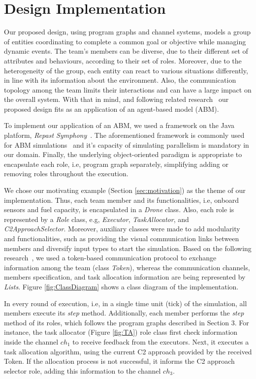 \newpage
\section{Design Implementation}
\label{sec:design}

Our proposed design, using program graphs and channel systems, models a group of entities coordinating to complete a common goal or objective while managing dynamic events. The team's members can be diverse, due to their different set of attributes and behaviours, according to their set of roles. Moreover, due to the heterogeneity of the group, each entity can react to various situations differently, in line with its information about the environment. Also, the communication topology among the team limits their interactions and can have a large impact on the overall system. With that in mind, and following related research~\cite{evaluating} our proposed design fits as an application of an agent-based model (ABM). 

To implement our application of an ABM, we used a framework on the Java platform, \textit{Repast Symphony}~\cite{repastDoc}. The aforementioned framework is commonly used for ABM simulations~\cite{repast} and it's capacity of simulating parallelism is mandatory in our domain. Finally, the underlying object-oriented paradigm is appropriate to encapsulate each role, i.e, program graph separately, simplifying adding or removing roles throughout the execution.

We chose our motivating example (Section \ref{sec:motivation}) as the theme of our implementation. Thus, each team member and its functionalities, i.e, onboard sensors and fuel capacity, is encapsulated in a \textit{Drone} class. Also, each role is represented by a \textit{Role} class, e.g, \textit{Executor}, \textit{TaskAllocator}, and \textit{C2ApproachSelector}. Moreover, auxiliary classes were made to add modularity and functionalities, such as providing the visual communication links between members and diversify input types to start the simulation. Based on the following research~\cite{swarmGap}, we used a token-based communication protocol to exchange information among the team (class \textit{Token}), whereas the communication channels, members specification, and task allocation information are being represented by \textit{Lists}. Figure \ref{fig:ClassDiagram} shows a class diagram of the implementation.

In every round of execution, i.e, in a single time unit (tick) of the simulation, all members execute its \textit{step} method. Additionally, each member performs the \textit{step} method of its roles, which follows the program graphs described in Section 3. For instance, the task allocator (Figure \ref{fig:TA}) role class first check information inside the channel $ch_1$ to receive feedback from the executors. Next, it executes a task allocation algorithm, using the current C2 approach provided by the received Token. If the allocation process is not successful, it informs the C2 approach selector role, adding this information to the channel $ch_3$.

